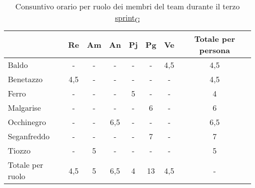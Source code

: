 \begin{table}[!h]
	\centering
	\begin{tabular}{ | l | c | c | c | c | c | c | c | }
		\hline
		\textbf{}        & \textbf{Re} & \textbf{Am} & \textbf{An} & \textbf{Pj} & \textbf{Pg} & \textbf{Ve} & \textbf{Totale per persona} \\
		\hline
		Baldo            & -           & -           & -           & -           & -           & 4,5         & 4,5                         \\
		Benetazzo        & 4,5         & -           & -           & -           & -           & -           & 4,5                         \\
		Ferro            & -           & -           & -           & 5           & -           & -           & 4                           \\
		Malgarise        & -           & -           & -           & -           & 6           & -           & 6                           \\
		Occhinegro       & -           & -           & 6,5         & -           & -           & -           & 6,5                         \\
		Seganfreddo      & -           & -           & -           & -           & 7           & -           & 7                           \\
		Tiozzo           & -           & 5           & -           & -           & -           & -           & 5                           \\
		\hline
		Totale per ruolo & 4,5         & 5           & 6,5         & 4           & 13          & 4,5         & -                           \\
		\hline
	\end{tabular}
	\caption{Consuntivo orario per ruolo dei membri del team durante il terzo \href{https://7last.github.io/docs/rtb/documentazione-interna/glossario\#sprint}{sprint\textsubscript{G}}}
	
\end{table}

